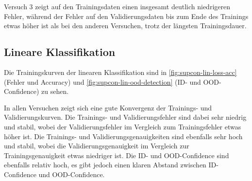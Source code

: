 Versuch 3 zeigt auf den Trainingsdaten einen insgesamt deutlich niedrigeren Fehler, während der Fehler auf den Validierungsdaten bis zum Ende des Trainings etwas höher ist als bei den anderen Versuchen, trotz der längsten Trainingsdauer.

\subsection{Lineare Klassifikation} \label{subsec:supcon-lin-results}

Die Trainingskurven der linearen Klassifikation sind in \autoref{fig:supcon-lin-loss-acc} (Fehler und Accuracy) und \autoref{fig:supcon-lin-ood-detection} (ID- und OOD-Confidence) zu sehen.

In allen Versuchen zeigt sich eine gute Konvergenz der Trainings- und Validierungskurven. Die Trainings- und Validierungsfehler sind dabei sehr niedrig und stabil, wobei der Validierungsfehler im Vergleich zum Trainingsfehler etwas höher ist. Die Trainings- und Validierungsgenauigkeiten sind ebenfalls sehr hoch und stabil, wobei die Validierungsgenauigkeit im Vergleich zur Trainingsgenauigkeit etwas niedriger ist. Die ID- und OOD-Confidence sind ebenfalls relativ hoch, es gibt jedoch einen klaren Abstand zwischen ID-Confidence und OOD-Confidence.

